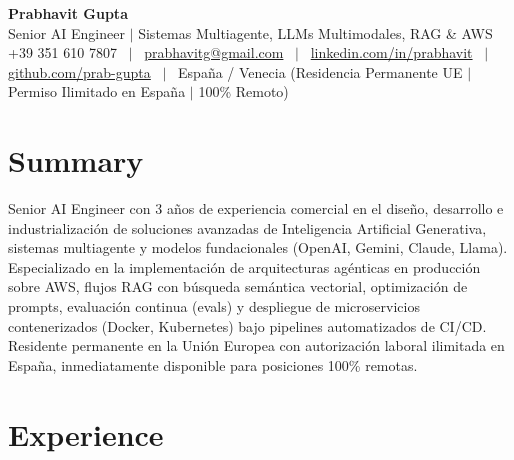 \documentclass[a4paper,10pt]{article}
\begin{document}
\begin{minipage}[c]{0.80\textwidth}
  {\Huge\bfseries Prabhavit Gupta}\\[3pt]
  {\color{accent}\large Senior AI Engineer $\vert$ Sistemas Multiagente, LLMs Multimodales, RAG \& AWS}\\[6pt]
  {\footnotesize +39 351 610 7807 ~$\vert$~
  \href{mailto:prabhavitg@gmail.com}{prabhavitg@gmail.com} ~$\vert$~
  \href{https://www.linkedin.com/in/prabhavit/}{linkedin.com/in/prabhavit} ~$\vert$~
  \href{https://github.com/prab-gupta}{github.com/prab-gupta} ~$\vert$~
  España / Venecia (Residencia Permanente UE $\vert$ Permiso Ilimitado en España $\vert$ 100\% Remoto)}
\end{minipage}\hfill

\section{Summary}
Senior AI Engineer con 3 años de experiencia comercial en el diseño, desarrollo e industrialización de soluciones avanzadas de Inteligencia Artificial Generativa, sistemas multiagente y modelos fundacionales (OpenAI, Gemini, Claude, Llama). Especializado en la implementación de arquitecturas agénticas en producción sobre AWS, flujos RAG con búsqueda semántica vectorial, optimización de prompts, evaluación continua (evals) y despliegue de microservicios contenerizados (Docker, Kubernetes) bajo pipelines automatizados de CI/CD. Residente permanente en la Unión Europea con autorización laboral ilimitada en España, inmediatamente disponible para posiciones 100\% remotas.

\section{Experience}
\end{document}
